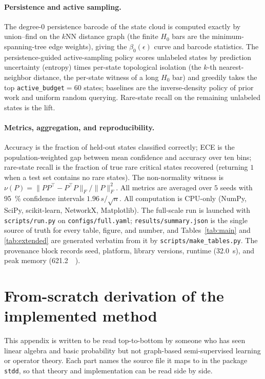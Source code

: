 \documentclass[aps,prresearch,reprint,amsmath,amssymb,nofootinbib,superscriptaddress,floatfix]{revtex4-2}
\theoremstyle{definition}
\theoremstyle{remark}
\theoremstyle{plain}
\begin{document}
\paragraph{Persistence and active sampling.}
The degree-$0$ persistence barcode of the state cloud is computed exactly by union--find on the $k$NN
distance graph (the finite $H_0$ bars are the minimum-spanning-tree edge weights), giving the
$\beta_0(\epsilon)$ curve and barcode statistics. The persistence-guided active-sampling policy scores
unlabeled states by prediction uncertainty (entropy) times per-state topological isolation (the $k$-th
nearest-neighbor distance, the per-state witness of a long $H_0$ bar) and greedily takes the top
\texttt{active\_budget}$=\num{60}$ states; baselines are the inverse-density policy of prior work and
uniform random querying. Rare-state recall on the remaining unlabeled states is the lift.

\paragraph{Metrics, aggregation, and reproducibility.}
Accuracy is the fraction of held-out states classified correctly; ECE is the population-weighted gap between
mean confidence and accuracy over ten bins; rare-state recall is the fraction of true rare critical states
recovered (returning $1$ when a test set contains no rare states). The non-normality witness is
$\nu(P)=\|PP^\top-P^\top P\|_F/\|P\|_F^2$. All metrics are averaged over $5$ seeds with \SI{95}{\percent}
confidence intervals $1.96\,s/\sqrt{n}$. All computation is CPU-only (NumPy, SciPy, scikit-learn, NetworkX,
Matplotlib). The full-scale run is launched with \texttt{scripts/run.py} on \texttt{configs/full.yaml};
\texttt{results/summary.json} is the single source of truth for every table, figure, and number, and
Tables~\ref{tab:main} and \ref{tab:extended} are generated verbatim from it by
\texttt{scripts/make\_tables.py}. The provenance block records seed, platform, library versions, runtime
(\SI{32.0}{\second}), and peak memory (\SI{621.2}{\mega\byte}).

\section{From-scratch derivation of the implemented method}
\label{sec:scratch}
This appendix is written to be read top-to-bottom by someone who has seen linear algebra and basic
probability but not graph-based semi-supervised learning or operator theory. Each part names the source
file it maps to in the package \texttt{stdd}, so that theory and implementation can be read side by
side.
\end{document}
